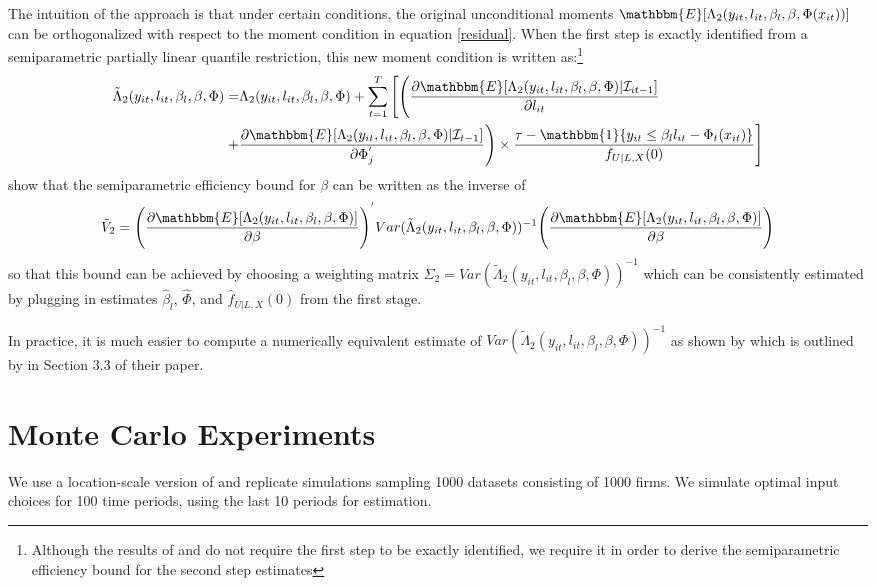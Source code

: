 \documentclass[11pt]{article}
\begin{document}
The intuition of the \cite{Ackerberg2014} approach is that under certain conditions, the original unconditional moments $\mathbbm{E}[\Lambda_{2}(y_{it}, l_{it}, \beta_{l}, \beta, \Phi(x_{it}))]$ can be orthogonalized with respect to the moment condition in equation \eqref{residual}. When the first step is exactly identified from a semiparametric partially linear quantile restriction, this new moment condition is written as:\footnote{Although the results of \cite{Chen2009} and \cite{Ai2012} do not require the first step to be exactly identified, we require it in order to derive the semiparametric efficiency bound for the second step estimates}
\begin{equation}\label{orthomoment}
\begin{split}
\tilde{\Lambda}_{2}(y_{it}, l_{it}, \beta_{l}, \beta, \Phi)=&\Lambda_{2}(y_{it}, l_{it}, \beta_{l}, \beta, \Phi)+\sum_{t=1}^{T}\Bigg[\Bigg(\frac{\partial \mathbbm{E}[\Lambda_{2}(y_{it}, l_{it}, \beta_{l}, \beta, \Phi)|\mathcal{I}_{it-1}]}{\partial l_{it}}\\
+&\frac{\partial \mathbbm{E}[\Lambda_{2}(y_{it}, l_{it}, \beta_{l}, \beta, \Phi)|\mathcal{I}_{t-1}]}{\partial \Phi^{'}_{j}}\Bigg)\times \frac{\tau-\mathbbm{1}\{y_{it}\leq\beta_{l}l_{it}-\Phi_{t}(x_{it})\}}{f_{U|L,X}(0)}\Bigg]
\end{split}
\end{equation}
\cite{Ackerberg2014} show that the semiparametric efficiency bound for $\beta$ can be written as the inverse of
\begin{equation}
\tilde{V}_{2}=\Bigg(\frac{\partial\mathbbm{E}[\Lambda_{2}(y_{it}, l_{it}, \beta_{l}, \beta, \Phi)]}{\partial\beta}\Bigg)^{'}Var(\tilde{\Lambda}_{2}(y_{it}, l_{it}, \beta_{l}, \beta, \Phi))^{-1}\Bigg(\frac{\partial\mathbbm{E}[\Lambda_{2}(y_{it}, l_{it}, \beta_{l}, \beta, \Phi)]}{\partial\beta}\Bigg)
\end{equation}
so that this bound can be achieved by choosing a weighting matrix $\Sigma_{2}=Var(\tilde{\Lambda}_{2}(y_{it}, l_{it}, \beta_{l}, \beta, \Phi))^{-1}$ which can be consistently estimated by plugging in estimates $\hat{\beta}_{l}$, $\hat{\Phi}$, and $\hat{f}_{U|L,X}(0)$ from the first stage.

In practice, it is much easier to compute a numerically equivalent estimate of $Var(\tilde{\Lambda}_{2}(y_{it}, l_{it}, \beta_{l}, \beta, \Phi))^{-1}$ as shown by \cite{Ackerberg2012} which is outlined by \cite{Ackerberg2014} in Section 3.3 of their paper. 

\section{Monte Carlo Experiments} \label{montecarlo}
We use a location-scale version of \cite{Levinsohn2003} and replicate \cite{Ackerberg2015} simulations sampling 1000 datasets consisting of 1000 firms. We simulate optimal input choices for 100 time periods, using the last 10 periods for estimation. 
\end{document}
